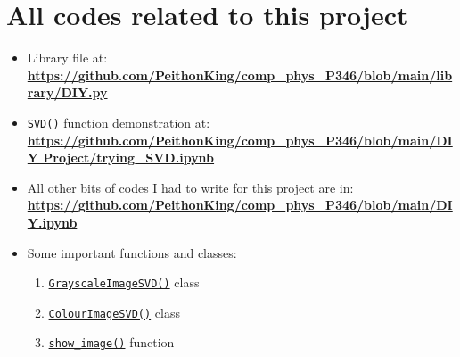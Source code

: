 \section{All codes related to this project}
	\begin{itemize}
		\item Library file at:\\
		\href{https://github.com/PeithonKing/comp_phys_P346/blob/main/library/DIY.py}{\textbf{https://github.com/PeithonKing/comp\_phys\_P346/blob/main/library/DIY.py}}

		\item \texttt{SVD()} function demonstration at:\\
		\href{https://github.com/PeithonKing/comp_phys_P346/blob/main/DIY%20Project/trying_SVD.ipynb}{\textbf{https://github.com/PeithonKing/comp\_phys\_P346/blob/main/DIY Project/trying\_SVD.ipynb}}

		\item All other bits of codes I had to write for this project are in:\\
		\href{https://github.com/PeithonKing/comp_phys_P346/blob/main/DIY.ipynb}{\textbf{https://github.com/PeithonKing/comp\_phys\_P346/blob/main/DIY.ipynb}}

		\item Some important functions and classes: 
		
		\begin{enumerate}
			\item \href{https://github.com/PeithonKing/comp_phys_P346/blob/main/library/DIY.py#L50-L72}{\texttt{GrayscaleImageSVD()}} class
			\item \href{https://github.com/PeithonKing/comp_phys_P346/blob/main/library/DIY.py#L74-L119}{\texttt{ColourImageSVD()}} class
			\item \href{https://github.com/PeithonKing/comp_phys_P346/blob/main/library/DIY.py#L7-L19}{\texttt{show\_image()}} function
		\end{enumerate}
		
	\end{itemize}
